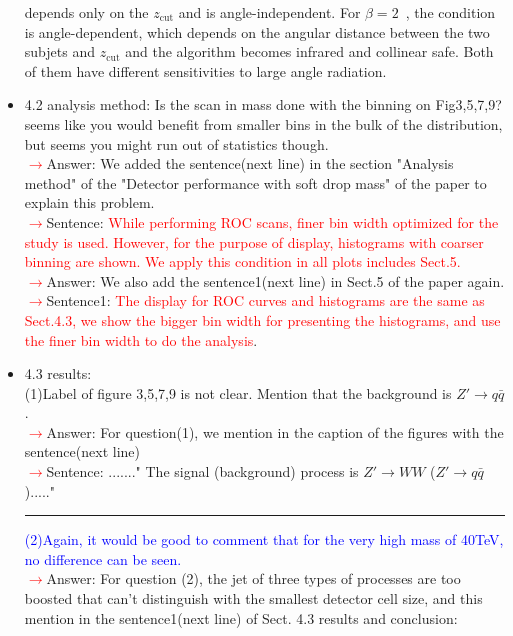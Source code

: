 \documentclass[final,1p,11pt]{elsarticle}
\begin{document}
\begin{itemize}
{depends only on the $z_\mathrm{cut}$ and is angle-independent. For $\beta=2$~\cite{Aaboud:2017qwh}, the condition is angle-dependent, which depends on the angular distance between the two subjets and $z_\mathrm{cut}$ and the algorithm becomes infrared and collinear safe. Both of them have different sensitivities to large angle radiation.}\\
\item 4.2 analysis method: Is the scan in mass done with the binning on Fig3,5,7,9? seems like you would benefit from smaller bins in the bulk of the distribution, but seems you might run out of statistics though.\\
 \textcolor{red}{$\rightarrow$}Answer: We added the sentence(next line) in the section "Analysis method" of the "Detector performance with soft drop mass" of the paper to explain this problem.\\
 \textcolor{red}{$\rightarrow$}Sentence: \textcolor{red}{While performing ROC scans, finer bin width optimized for the study is used. However, for the purpose of display, histograms with coarser binning are shown. We apply this condition in all plots includes Sect.5.}\\
 \textcolor{red}{$\rightarrow$}Answer: We also add the sentence1(next line) in Sect.5 of the paper again.\\
 \textcolor{red}{$\rightarrow$}Sentence1: \textcolor{red}{The display for ROC curves and histograms are the same as Sect.4.3, we show the bigger bin width for presenting the histograms, and use the finer bin width to do the analysis}.
\item 4.3 results:\\
 (1)Label of figure 3,5,7,9 is not clear. Mention that the background is $Z'\rightarrow q\bar{q}$.\\
 \textcolor{red}{$\rightarrow$}Answer:  For question(1), we mention in the caption of the figures with the sentence(next line)\\
 \textcolor{red}{$\rightarrow$}Sentence:  ......." The signal (background) process is $Z' \rightarrow WW$ ($Z'\rightarrow q\bar{q}$)....."\\
  \rule{\textwidth}{0.4pt}
\textcolor{blue}{(2)Again, it would be good to comment that for the very high mass of 40TeV, no difference can be seen.}\\
 \textcolor{red}{$\rightarrow$}Answer:  For question (2), the jet of three types of processes are too boosted that can't distinguish with the smallest detector cell size, and this mention in the sentence1(next line) of Sect. 4.3 results and conclusion:\\

\end{itemize}
\end{document}
